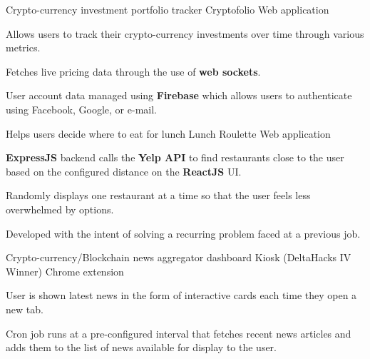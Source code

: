 


\begin{cventries}


\cventry
{Crypto-currency investment portfolio tracker} %
{Cryptofolio \href{https://github.com/kdelalic/Cryptofolio}{\faGithub}} %
{Web application}
{}
{ %
\begin{cvitems}
\item {Allows users to track their crypto-currency investments over time through various metrics.}
\item {Fetches live pricing data through the use of \textbf{web sockets}.}
\item {User account data managed using \textbf{Firebase} which allows users to authenticate using Facebook, Google, or e-mail.}
\end{cvitems}
}


\cventry
{Helps users decide where to eat for lunch} %
{Lunch Roulette \href{https://github.com/kdelalic/lunch-roulette}{\faGithub}} %
{Web application}
{}
{ %
\begin{cvitems}
\item {\textbf{ExpressJS} backend calls the \textbf{Yelp API} to find restaurants close to the user based on the configured distance on the \textbf{ReactJS} UI.}
\item {Randomly displays one restaurant at a time so that the user feels less overwhelmed by options.}
\item {Developed with the intent of solving a recurring problem faced at a previous job.}
\end{cvitems}
}


\cventry
{Crypto-currency/Blockchain news aggregator dashboard} %
{Kiosk (DeltaHacks IV Winner)  \href{https://github.com/kdelalic/kiosk}{\faGithub}} %
{Chrome extension}
{}
{ %
\begin{cvitems}
\item {User is shown latest news in the form of interactive cards each time they open a new tab.}
\item {Cron job runs at a pre-configured interval that fetches recent news articles and adds them to the list of news available for display to the user.}
\end{cvitems}
}


\end{cventries}
